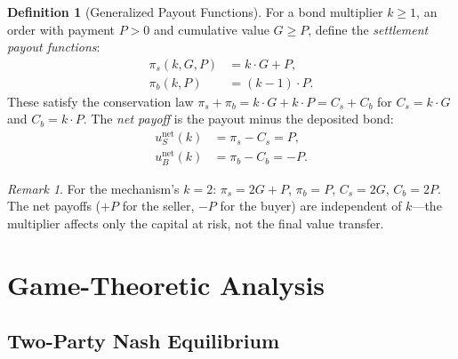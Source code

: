 \documentclass[11pt,a4paper]{article}
\theoremstyle{definition}
\newtheorem{definition}[theorem]{Definition}
\theoremstyle{remark}
\newtheorem{remark}[theorem]{Remark}
\newcommand{\pay}{P}           %
\newcommand{\cumval}{G}        %
\newcommand{\sbond}{C_s}       %
\newcommand{\bbond}{C_b}       %
\newcommand{\spay}{\pi_s}      %
\newcommand{\bpay}{\pi_b}      %
\newcommand{\ub}{u_B}          %
\newcommand{\us}{u_S}          %
\begin{document}
\begin{definition}[Generalized Payout Functions]
\label{def:payout-functions}
For a bond multiplier $k \geq 1$, an order with payment $\pay > 0$
and cumulative value $\cumval \geq \pay$, define the
\emph{settlement payout functions}:
\begin{align}
  \spay(k, \cumval, \pay) &= k \cdot \cumval + \pay,
    \label{eq:general-seller-payout} \\
  \bpay(k, \pay) &= (k - 1) \cdot \pay.
    \label{eq:general-buyer-payout}
\end{align}
These satisfy the conservation law
$\spay + \bpay = k \cdot \cumval + k \cdot \pay = \sbond + \bbond$
for $\sbond = k \cdot \cumval$ and $\bbond = k \cdot \pay$. The
\emph{net payoff} is the payout minus the deposited bond:
\begin{align}
  \us^{\text{net}}(k) &= \spay - \sbond = \pay,
    \label{eq:seller-net} \\
  \ub^{\text{net}}(k) &= \bpay - \bbond = -\pay.
    \label{eq:buyer-net}
\end{align}
\end{definition}

\begin{remark}
For the mechanism's $k = 2$: $\spay = 2\cumval + \pay$,
$\bpay = \pay$, $\sbond = 2\cumval$, $\bbond = 2\pay$. The
net payoffs ($+\pay$ for the seller, $-\pay$ for the buyer) are
independent of $k$---the multiplier affects only the capital at risk,
not the final value transfer.
\end{remark}

\section{Game-Theoretic Analysis}
\label{sec:game-theory}

\subsection{Two-Party Nash Equilibrium}
\end{document}
